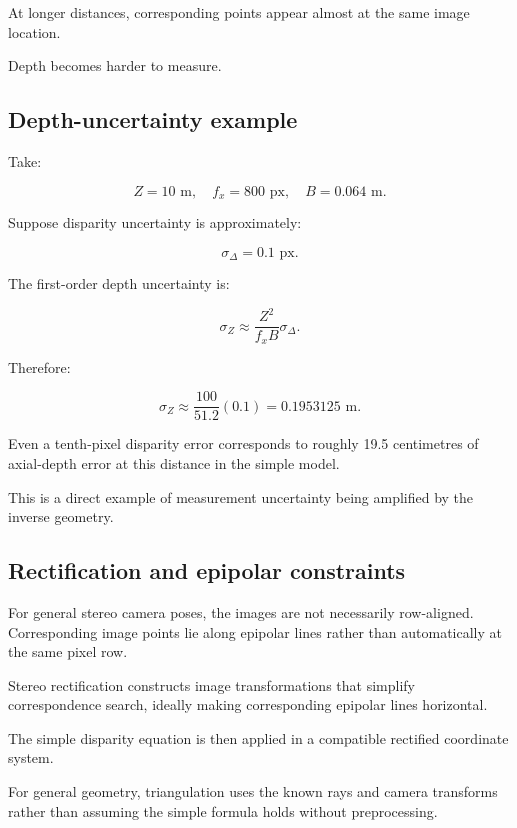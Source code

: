 At longer distances, corresponding points appear almost at the same image location.

Depth becomes harder to measure.

\subsection{Depth-uncertainty example}\label{02-foundations-ii-ch035-depth-uncertainty-example}

\hypertarget{02-foundations-ii-ch035-depth-uncertainty-example}{}

Take:

\[ Z=10\text{ m},\quad f_x=800\text{ px},\quad B=0.064\text{ m}. \]

Suppose disparity uncertainty is approximately:

\[ \sigma_\Delta=0.1\text{ px}. \]

The first-order depth uncertainty is:

\[ \sigma_Z\approx \frac{Z^2}{f_xB}\sigma_\Delta. \]

Therefore:

\[ \sigma_Z\approx \frac{100}{51.2}(0.1) =\boxed{0.1953125\text{ m}}. \]

Even a tenth-pixel disparity error corresponds to roughly 19.5 centimetres of axial-depth error at this distance in the simple model.

This is a direct example of measurement uncertainty being amplified by the inverse geometry.

\subsection{Rectification and epipolar constraints}\label{02-foundations-ii-ch035-rectification-and-epipolar-constraints}

\hypertarget{02-foundations-ii-ch035-rectification-and-epipolar-constraints}{}

For general stereo camera poses, the images are not necessarily row-aligned. Corresponding image points lie along epipolar lines rather than automatically at the same pixel row.

Stereo rectification constructs image transformations that simplify correspondence search, ideally making corresponding epipolar lines horizontal.

The simple disparity equation is then applied in a compatible rectified coordinate system.

For general geometry, triangulation uses the known rays and camera transforms rather than assuming the simple formula holds without preprocessing.

